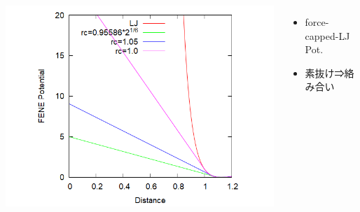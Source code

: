 \documentclass[12pt, dvipdfmx]{beamer}
\begin{document}
\begin{frame}
\begin{columns}[T, onlytextwidth]
				\begin{center}
					\includegraphics[width=1.2\textwidth]{Ev_fcLJ.png}
				\end{center}
				\vspace{-3mm}
				\scriptsize
				\begin{itemize}
					\item force-capped-LJ Pot.
					\item 素抜け⇒絡み合い
				\end{itemize}
		\end{columns}
\end{frame}
\end{document}
